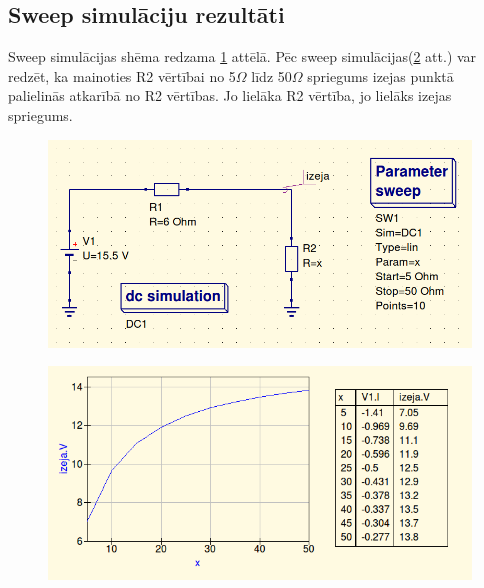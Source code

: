 \documentclass{report}
\begin{document}
\subsection{Sweep simulāciju rezultāti}
Sweep simulācijas shēma redzama \ref{att:6} attēlā. Pēc sweep simulācijas(\ref{att:7} att.) var redzēt, ka mainoties R2 vērtībai no 5$ \Omega$ līdz 50$ \Omega$ spriegums izejas punktā palielinās atkarībā no R2 vērtības. Jo lielāka R2 vērtība, jo lielāks izejas spriegums. 
\begin{figure}[b!]
\centering
\includegraphics[scale=0.5]{swesh.png}
\label{att:6}
\end{figure}

\begin{figure}[b!]
\centering
\includegraphics[scale=0.5]{swegrtb.png}
\label{att:7}
\end{figure}
\end{document}
